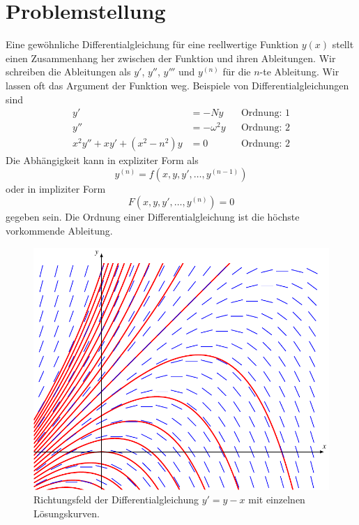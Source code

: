 %
%
%
\section{Problemstellung
\label{buch:section:dglproblemstellung}}
Eine gewöhnliche Differentialgleichung für eine reellwertige
Funktion $y(x)$ stellt einen Zusammenhang her zwischen der Funktion
und ihren Ableitungen.
Wir schreiben die Ableitungen als $y'$, $y''$, $y'''$ und $y^{(n)}$
für die $n$-te Ableitung.
Wir lassen oft das Argument der Funktion weg.
Beispiele von Differentialgleichungen sind
\begin{align*}
y'&=-Ny
&&\text{Ordnung: $1$}
\\
y''&=-\omega^2 y
&&\text{Ordnung: $2$}
\\
x^2y''+xy'+(x^2-n^2)y&=0
&&\text{Ordnung: $2$}
\end{align*}
Die Abhängigkeit kann in expliziter Form als
%
%
\begin{equation}
y^{(n)}=f(x,y,y',\dots,y^{(n-1)})
\label{grundlagen:explizit}
\end{equation}
oder in impliziter Form
%
%
\[
F(x,y,y',\dots,y^{(n)})=0
\]
gegeben sein.
Die Ordnung einer Differentialgleichung ist die höchste vorkommende
Ableitung.
%

\begin{figure}
\centering
\includegraphics{chapters/50-ode/figures/grundlagen.pdf}
\caption{Richtungsfeld der Differentialgleichung $y'=y-x$ mit
einzelnen Lösungskurven.
\label{grundlagen:richtungsfeld}}
\end{figure}%

